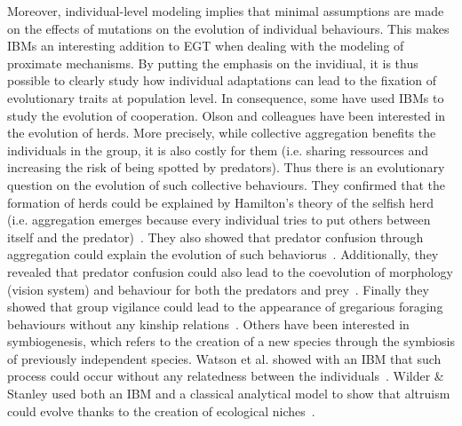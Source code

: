     Moreover, individual-level modeling implies that minimal assumptions are made on the effects of mutations on the evolution of individual behaviours. This makes IBMs an interesting addition to EGT when dealing with the modeling of proximate mechanisms. By putting the emphasis on the invidiual, it is thus possible to clearly study how individual adaptations can lead to the fixation of evolutionary traits at population level. In consequence, some have used IBMs to study the evolution of cooperation. Olson and colleagues have been interested in the evolution of herds. More precisely, while collective aggregation benefits the individuals in the group, it is also costly for them (i.e. sharing ressources and increasing the risk of being spotted by predators). Thus there is an evolutionary question on the evolution of such collective behaviours. They confirmed that the formation of herds could be explained by Hamilton's theory of the selfish herd (i.e. aggregation emerges because every individual tries to put others between itself and the predator)~\parencite{Hamilton1971, Olson2013a}. They also showed that predator confusion through aggregation could explain the evolution of such behaviorus~\parencite{Olson2013}. Additionally, they revealed that predator confusion could also lead to the coevolution of morphology (vision system) and behaviour for both the predators and prey~\parencite{Olson2016}. Finally they showed that group vigilance could lead to the appearance of gregarious foraging behaviours without any kinship relations~\parencite{Olson2014a}. Others have been interested in symbiogenesis, which refers to the creation of a new species through the symbiosis of previously independent species. Watson et al. showed with an IBM that such process could occur without any relatedness between the individuals~\parencite{Watson1992}. Wilder \& Stanley used both an IBM and a classical analytical model to show that altruism could evolve thanks to the creation of ecological niches~\parencite{Wilder2015}.


